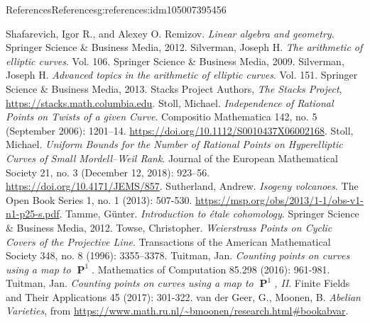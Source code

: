 \documentclass[oneside,10pt,]{book}
\numberwithin{equation}{section}
\DeclareMathOperator{\PP}{\mathbf{P}}
\begin{document}
\begin{references-chapter-numberless}{References}{}{References}{}{}{g:references:idm105007395456}
\begin{thebibliography}{9}
\hypertarget{x:biblio:bib-shafarevich-remizov}{}Shafarevich, Igor R., and Alexey O. Remizov. \textit{Linear algebra and geometry}. Springer Science \& Business Media, 2012.
\hypertarget{x:biblio:bib-silverman}{}Silverman, Joseph H. \textit{The arithmetic of elliptic curves}. Vol. 106. Springer Science \& Business Media, 2009.
\hypertarget{x:biblio:bib-silverman-advanced}{}Silverman, Joseph H. \textit{Advanced topics in the arithmetic of elliptic curves}. Vol. 151. Springer Science \& Business Media, 2013.
\hypertarget{x:biblio:bib-stacks}{}Stacks Project Authors, \textit{The Stacks Project}, \url{https://stacks.math.columbia.edu}.
\hypertarget{x:biblio:bib-stoll-independence}{}Stoll, Michael. \textit{Independence of Rational Points on Twists of a given Curve}. Compositio Mathematica 142, no. 5 (September 2006): 1201–14. \url{https://doi.org/10.1112/S0010437X06002168}.
\hypertarget{x:biblio:bib-stoll-uniform}{}Stoll, Michael. \textit{Uniform Bounds for the Number of Rational Points on Hyperelliptic Curves of Small Mordell–Weil Rank}. Journal of the European Mathematical Society 21, no. 3 (December 12, 2018): 923–56. \url{https://doi.org/10.4171/JEMS/857}.
\hypertarget{x:biblio:bib-sutherland}{}Sutherland, Andrew. \textit{Isogeny volcanoes}. The Open Book Series 1, no. 1 (2013): 507-530. \url{https://msp.org/obs/2013/1-1/obs-v1-n1-p25-s.pdf}.
\hypertarget{x:biblio:bib-tamme}{}Tamme, Günter. \textit{Introduction to étale cohomology}. Springer Science \& Business Media, 2012.
\hypertarget{x:biblio:bib-towse}{}Towse, Christopher. \textit{Weierstrass Points on Cyclic Covers of the Projective Line}. Transactions of the American Mathematical Society 348, no. 8 (1996): 3355–3378.
\hypertarget{x:biblio:bib-tuitman-map-to-p1-1}{}Tuitman, Jan. \textit{Counting points on curves using a map to \(\PP^1\)}. Mathematics of Computation 85.298 (2016): 961-981.
\hypertarget{x:biblio:bib-tuitman-map-to-p1-2}{}Tuitman, Jan. \textit{Counting points on curves using a map to \(\PP^1\), II}. Finite Fields and Their Applications 45 (2017): 301-322.
\hypertarget{x:biblio:bib-vandergeer-moonen}{}van der Geer, G., Moonen, B. \textit{Abelian Varieties}, from \url{https://www.math.ru.nl/\~bmoonen/research.html\#bookabvar}.

\end{thebibliography}
\end{references-chapter-numberless}
\end{document}
